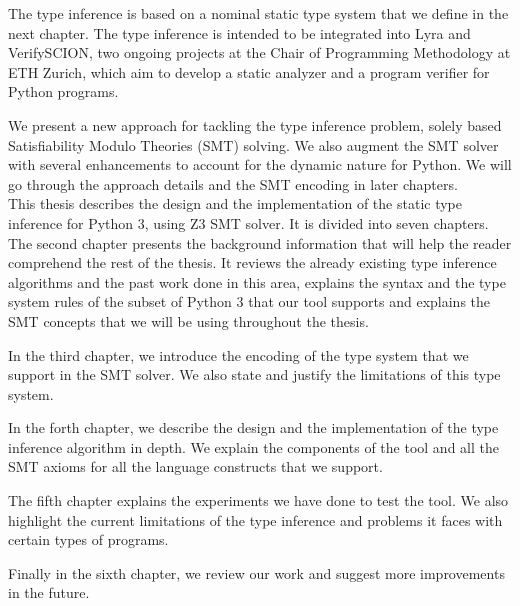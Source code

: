 The type inference is based on a nominal static type system that we define in the next chapter. The type inference is intended to be integrated into Lyra and VerifySCION, two ongoing projects at the Chair of Programming Methodology at ETH Zurich, which aim to develop a static analyzer and a program verifier for Python programs.

We present a new approach for tackling the type inference problem, solely based Satisfiability Modulo Theories (SMT) solving. We also augment the SMT solver with several enhancements to account for the dynamic nature for Python. We will go through the approach details and the SMT encoding in later chapters.\\

This thesis describes the design and the implementation of the static type inference for Python 3, using Z3 SMT solver. It is divided into seven chapters. The second chapter presents the background information that will help the reader comprehend the rest of the thesis. It reviews the already existing type inference algorithms and the past work done in this area, explains the syntax and the type system rules of the subset of Python 3 that our tool supports and explains the SMT concepts that we will be using throughout the thesis.

In the third chapter, we introduce the encoding of the type system that we support in the SMT solver. We also state and justify the limitations of this type system.

In the forth chapter, we describe the design and the implementation of the type inference algorithm in depth. We explain the components of the tool and all the SMT axioms for all the language constructs that we support.

The fifth chapter explains the experiments we have done to test the tool. We also highlight the current limitations of the type inference and problems it faces with certain types of programs.

Finally in the sixth chapter, we review our work and suggest more improvements in the future.